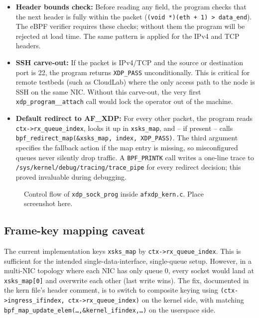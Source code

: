 \documentclass[10pt, letterpaper, twocolumn]{article}
\begin{document}
\begin{itemize}
    \item \textbf{Header bounds check:} Before reading any field, the program checks that the next header is fully within the packet (\texttt{(void *)(eth + 1) > data\_end}). The eBPF verifier requires these checks; without them the program will be rejected at load time. The same pattern is applied for the IPv4 and TCP headers.
    \item \textbf{SSH carve-out:} If the packet is IPv4/TCP and the source or destination port is 22, the program returns \texttt{XDP\_PASS} unconditionally. This is critical for remote testbeds (such as CloudLab) where the only access path to the node is SSH on the same NIC. Without this carve-out, the very first \texttt{xdp\_program\_\_attach} call would lock the operator out of the machine.
    \item \textbf{Default redirect to AF\_XDP:} For every other packet, the program reads \texttt{ctx->rx\_queue\_index}, looks it up in \texttt{xsks\_map}, and -- if present -- calls \texttt{bpf\_redirect\_map(\&xsks\_map, index, XDP\_PASS)}. The third argument specifies the fallback action if the map entry is missing, so misconfigured queues never silently drop traffic. A \texttt{BPF\_PRINTK} call writes a one-line trace to \texttt{/sys/kernel/debug/tracing/trace\_pipe} for every redirect decision; this proved invaluable during debugging.
\end{itemize}

\begin{figure}[htbp]
    \centering
    \caption{Control flow of \texttt{xdp\_sock\_prog} inside \texttt{afxdp\_kern.c}. Place screenshot here.}
    \label{fig:kern_flow}
\end{figure}
\FloatBarrier

\subsection{Frame-key mapping caveat}

The current implementation keys \texttt{xsks\_map} by \texttt{ctx->rx\_queue\_index}. This is sufficient for the intended single-data-interface, single-queue setup. However, in a multi-NIC topology where each NIC has only queue 0, every socket would land at \texttt{xsks\_map[0]} and overwrite each other (last write wins). The fix, documented in the kern file's header comment, is to switch to composite keying using \texttt{(ctx->ingress\_ifindex, ctx->rx\_queue\_index)} on the kernel side, with matching \texttt{bpf\_map\_update\_elem(\dots,\&kernel\_ifindex,\dots)} on the userspace side.
\end{document}
